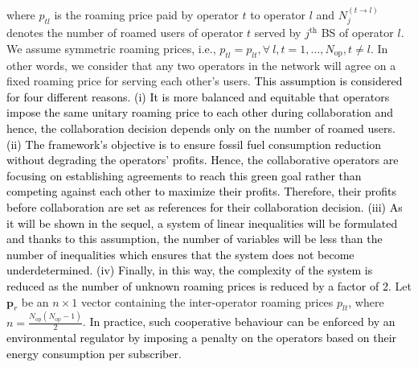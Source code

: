 \documentclass[10pt, letter, twocolumn]{IEEEtran}
\begin{document}
where $p_{tl}$ is the roaming price paid by operator $t$ to operator $l$ and $N_{j}^{(t \rightarrow l)}$ denotes the number of roamed users of operator $t$ served by $j^{\text{th}}$ BS of operator $l$. We assume symmetric roaming prices, i.e., $p_{tl} = p_{lt}, \forall \ l,t = 1,\ldots,N_{\text{op}}, t \neq l$. In other words, we consider that any two operators in the network will agree on a fixed roaming price for serving each other's users. \textcolor{black}{This assumption is considered for four different reasons. (i) \textcolor{black}{It is more balanced and equitable that operators impose the same unitary roaming price to each other during collaboration} and hence, the collaboration decision depends only on the number of roamed users. (ii) The framework's objective is to ensure fossil fuel consumption reduction without degrading the operators' profits. Hence, the collaborative operators are focusing on establishing agreements to reach this green goal rather than competing against each other to maximize their profits. Therefore, their profits before collaboration are set as references for their collaboration decision. (iii) As it will be shown in the sequel, a system of linear inequalities will be formulated and thanks to this assumption, the number of variables will be less than the number of inequalities which ensures that the system does not become underdetermined. (iv) Finally, in this way, the complexity of the system is reduced as the number of unknown roaming prices is reduced by a factor of 2.} Let $\mathbf{p}_{r}$ be an $n \times 1$ vector containing the inter-operator roaming prices $p_{lt}$, where $n=\frac{N_{\text{op}}\left(N_{\text{op}}-1\right)}{2}$. \textcolor{black}{In practice, such cooperative behaviour can be enforced by an environmental regulator by imposing a penalty on the operators based on their energy consumption per subscriber}.
\end{document}
